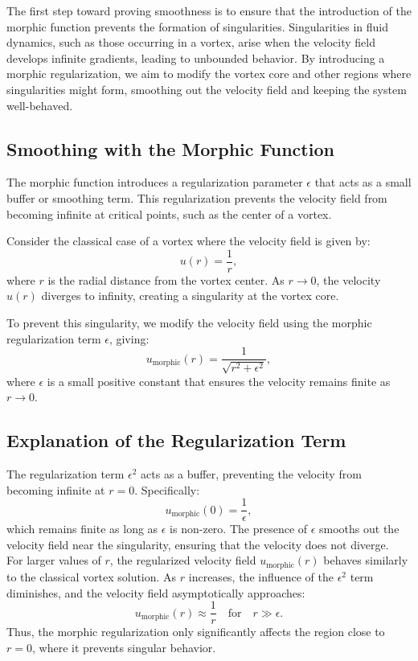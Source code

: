 \documentclass{article}
\begin{document}
The first step toward proving smoothness is to ensure that the introduction of the morphic function prevents the formation of singularities. Singularities in fluid dynamics, such as those occurring in a vortex, arise when the velocity field develops infinite gradients, leading to unbounded behavior. By introducing a morphic regularization, we aim to modify the vortex core and other regions where singularities might form, smoothing out the velocity field and keeping the system well-behaved.

\subsection*{Smoothing with the Morphic Function}

The morphic function introduces a regularization parameter \( \epsilon \) that acts as a small buffer or smoothing term. This regularization prevents the velocity field from becoming infinite at critical points, such as the center of a vortex.

Consider the classical case of a vortex where the velocity field is given by:
\[
u(r) = \frac{1}{r},
\]
where \( r \) is the radial distance from the vortex center. As \( r \to 0 \), the velocity \( u(r) \) diverges to infinity, creating a singularity at the vortex core.

To prevent this singularity, we modify the velocity field using the morphic regularization term \( \epsilon \), giving:
\[
u_{\text{morphic}}(r) = \frac{1}{\sqrt{r^2 + \epsilon^2}},
\]
where \( \epsilon \) is a small positive constant that ensures the velocity remains finite as \( r \to 0 \).

\subsection*{Explanation of the Regularization Term}

The regularization term \( \epsilon^2 \) acts as a buffer, preventing the velocity from becoming infinite at \( r = 0 \). Specifically:
\[
u_{\text{morphic}}(0) = \frac{1}{\epsilon},
\]
which remains finite as long as \( \epsilon \) is non-zero. The presence of \( \epsilon \) smooths out the velocity field near the singularity, ensuring that the velocity does not diverge.
\\

For larger values of \( r \), the regularized velocity field \( u_{\text{morphic}}(r) \) behaves similarly to the classical vortex solution. As \( r \) increases, the influence of the \( \epsilon^2 \) term diminishes, and the velocity field asymptotically approaches:
\[
u_{\text{morphic}}(r) \approx \frac{1}{r} \quad \text{for} \quad r \gg \epsilon.
\]
Thus, the morphic regularization only significantly affects the region close to \( r = 0 \), where it prevents singular behavior.
\end{document}
